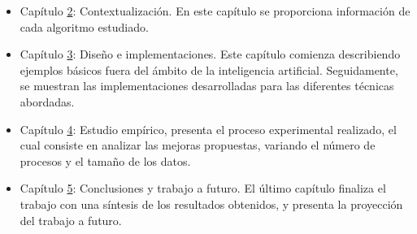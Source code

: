	
	\begin{itemize}
		\item Capítulo \hyperref[cap:c2_context]{2}: Contextualización. En este capítulo se proporciona información de cada algoritmo estudiado.
		\item Capítulo \hyperref[cap:c3_implementaciones]{3}: Diseño e implementaciones. Este capítulo comienza describiendo ejemplos básicos fuera del ámbito de la inteligencia artificial. Seguidamente, se muestran las implementaciones desarrolladas para las diferentes técnicas abordadas.
		\item Capítulo \hyperref[cap:c4_estudio]{4}: Estudio empírico, presenta el proceso experimental realizado, el cual consiste en analizar las mejoras propuestas, variando el número de procesos y el tamaño de los datos. 
		\item Capítulo \hyperref[cap:c5_conclu]{5}: Conclusiones y trabajo a futuro. El último capítulo finaliza el trabajo con una síntesis  de los resultados obtenidos, y presenta la proyección del trabajo a futuro.
	\end{itemize}


















